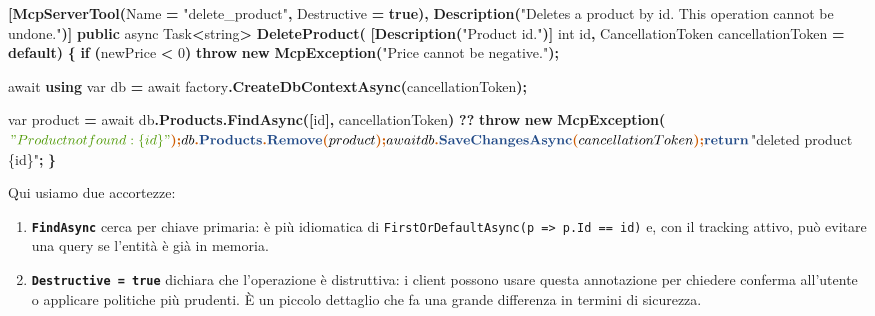\documentclass[
  italian,
  10pt,
]{book}
\newenvironment{Shaded}{\begin{snugshade}}{\end{snugshade}}
\newcommand{\DataTypeTok}[1]{\textcolor[rgb]{0.13,0.29,0.53}{#1}}
\newcommand{\DecValTok}[1]{\textcolor[rgb]{0.00,0.00,0.81}{#1}}
\newcommand{\FunctionTok}[1]{\textcolor[rgb]{0.13,0.29,0.53}{\textbf{#1}}}
\newcommand{\KeywordTok}[1]{\textcolor[rgb]{0.13,0.29,0.53}{\textbf{#1}}}
\newcommand{\NormalTok}[1]{#1}
\newcommand{\OperatorTok}[1]{\textcolor[rgb]{0.81,0.36,0.00}{\textbf{#1}}}
\newcommand{\StringTok}[1]{\textcolor[rgb]{0.31,0.60,0.02}{#1}}
\providecommand{\tightlist}{%
  \setlength{\itemsep}{0pt}\setlength{\parskip}{0pt}}
\begin{document}
\begin{Shaded}
\begin{Highlighting}[]
\OperatorTok{[}\FunctionTok{McpServerTool}\OperatorTok{(}\NormalTok{Name }\OperatorTok{=} \StringTok{"delete\_product"}\OperatorTok{,}\NormalTok{ Destructive }\OperatorTok{=} \KeywordTok{true}\OperatorTok{),}
 \FunctionTok{Description}\OperatorTok{(}\StringTok{"Deletes a product by id. This operation cannot be undone."}\OperatorTok{)]}
\KeywordTok{public}\NormalTok{ async Task}\OperatorTok{\textless{}}\DataTypeTok{string}\OperatorTok{\textgreater{}} \FunctionTok{DeleteProduct}\OperatorTok{(}
    \OperatorTok{[}\FunctionTok{Description}\OperatorTok{(}\StringTok{"Product id."}\OperatorTok{)]} \DataTypeTok{int}\NormalTok{ id}\OperatorTok{,}
\NormalTok{    CancellationToken cancellationToken }\OperatorTok{=} \KeywordTok{default}\OperatorTok{)}
\OperatorTok{\{}
    \KeywordTok{if} \OperatorTok{(}\NormalTok{newPrice }\OperatorTok{\textless{}} \DecValTok{0}\OperatorTok{)}
        \KeywordTok{throw} \KeywordTok{new} \FunctionTok{McpException}\OperatorTok{(}\StringTok{"Price cannot be negative."}\OperatorTok{);}

\NormalTok{    await }\KeywordTok{using} \DataTypeTok{var}\NormalTok{ db }\OperatorTok{=}\NormalTok{ await factory}\OperatorTok{.}\FunctionTok{CreateDbContextAsync}\OperatorTok{(}\NormalTok{cancellationToken}\OperatorTok{);}

    \DataTypeTok{var}\NormalTok{ product }\OperatorTok{=}\NormalTok{ await db}\OperatorTok{.}\FunctionTok{Products}\OperatorTok{.}\FunctionTok{FindAsync}\OperatorTok{([}\NormalTok{id}\OperatorTok{],}\NormalTok{ cancellationToken}\OperatorTok{)}
        \OperatorTok{??} \KeywordTok{throw} \KeywordTok{new} \FunctionTok{McpException}\OperatorTok{(}\NormalTok{$}\StringTok{"Product not found: \{id\}"}\OperatorTok{);}

\NormalTok{    db}\OperatorTok{.}\FunctionTok{Products}\OperatorTok{.}\FunctionTok{Remove}\OperatorTok{(}\NormalTok{product}\OperatorTok{);}
\NormalTok{    await db}\OperatorTok{.}\FunctionTok{SaveChangesAsync}\OperatorTok{(}\NormalTok{cancellationToken}\OperatorTok{);}

    \KeywordTok{return}\NormalTok{ $}\StringTok{"deleted product \{id\}"}\OperatorTok{;}
\OperatorTok{\}}
\end{Highlighting}
\end{Shaded}

Qui usiamo due accortezze:

\begin{enumerate}
\def\labelenumi{\arabic{enumi}.}
\tightlist
\item
  \textbf{\texttt{FindAsync}} cerca per chiave primaria: è più
  idiomatica di
  \texttt{FirstOrDefaultAsync(p\ =\textgreater{}\ p.Id\ ==\ id)} e, con
  il tracking attivo, può evitare una query se l'entità è già in
  memoria.
\item
  \textbf{\texttt{Destructive\ =\ true}} dichiara che l'operazione è
  distruttiva: i client possono usare questa annotazione per chiedere
  conferma all'utente o applicare politiche più prudenti. È un piccolo
  dettaglio che fa una grande differenza in termini di sicurezza.
\end{enumerate}
\end{document}
